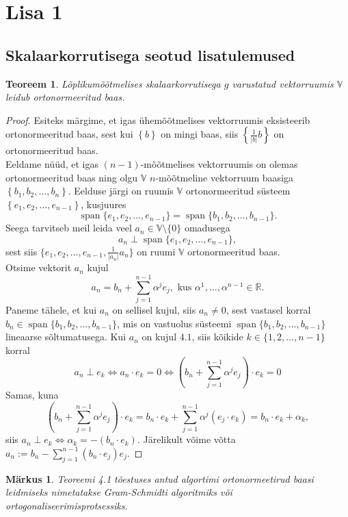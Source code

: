 \documentclass[a4paper,12pt]{article}
\newtheorem{teoreem}{Teoreem}[section]
\newtheorem{markus}{Märkus}[section]
\numberwithin{equation}{section}
\DeclareMathOperator{\spn}{span}
\begin{document}
\newpage
\section{Lisa 1}
\subsection{Skalaarkorrutisega seotud lisatulemused}

\begin{teoreem}
Lõplikumõõtmelises skalaarkorrutisega $g$ varustatud vektorruumis $\mathbb{V}$ leidub ortonormeeritud baas.
\end{teoreem}
\begin{proof}
Esiteks märgime, et igas ühemõõtmelises vektorruumis eksisteerib ortonormeeritud baas, sest kui $\left\lbrace b \right\rbrace$ on mingi baas, siis $\left\lbrace \frac{1}{|b|} b\right\rbrace$ on ortonormeeritud baas.\\
Eeldame nüüd, et igas $(n-1)$-mõõtmelises vektorruumis on olemas ortonormeeritud baas ning olgu $\mathbb{V}$ $n$-mõõtmeline vektorruum baasiga $\left\lbrace b_1, b_2, \dots, b_n \right\rbrace$. Eelduse järgi on ruumis $\mathbb{V}$ ortonormeeritud süsteem $\left\lbrace e_1, e_2, \dots, e_{n-1} \right\rbrace$, kusjuures
\[ \spn\{ e_1, e_2, \dots, e_{n-1}\} = \spn\{ b_1, b_2, \dots, b_{n-1}\}. \]
Seega tarvitseb meil leida veel $a_n \in \mathbb{V} \setminus \{0\}$ omadusega
\[a_n \perp \spn\{ e_1, e_2, \dots, e_{n-1}\},\]
sest siis $\{ e_1, e_2, \dots, e_{n-1}, \frac{1}{|a_n|}a_n\}$ on ruumi $\mathbb{V}$ ortonormeeritud baas.\\
Otsime vektorit $a_n$ kujul
\begin{equation}
a_n = b_n + \sum_{j = 1}^{n-1} \alpha^j e_j, \text{ kus } \alpha^1, \dots, \alpha^{n-1} \in \mathbb{R}.
\end{equation}
Paneme tähele, et kui $a_n$ on sellisel kujul, siis $a_n \neq 0$, sest vastasel korral $b_n \in \spn\{ b_1, b_2, \dots, b_{n-1}\}$, mis on vastuolus süsteemi $\spn\{ b_1, b_2, \dots, b_{n-1}\}$ lineaarse sõltumatusega.
Kui $a_n$ on kujul $4.1$, siis kõikide $k \in \{1, 2, \dots, n-1\}$ korral
\begin{equation*}
a_n \perp e_k \iff a_n \cdot e_k = 0 \iff \left(b_n + \sum_{j = 1}^{n-1} \alpha^j e_j\right) \cdot e_k = 0
\end{equation*}
Samas, kuna
\begin{equation*}
\left(b_n + \sum_{j = 1}^{n-1} \alpha^j e_j\right) \cdot e_k = b_n \cdot e_k + \sum_{j = 1}^{n-1} \alpha^j \left(e_j \cdot e_k \right) = b_n \cdot e_k + \alpha_k,
\end{equation*}
siis $a_n \perp e_k \iff \alpha_k = - \left(b_n \cdot e_k \right)$. Järelikult võime võtta $a_n := b_n - \sum_{j=1}^{n-1}\left(b_n \cdot e_j\right)e_j$.
\end{proof}
\begin{markus}
Teoreemi 4.1 tõestuses antud algortimi ortonormeetirud baasi leidmiseks nimetatakse \emph{Gram-Schmidti algoritmiks} või \emph{ortogonaliseerimisprotsessiks}.
\end{markus}
\end{document}
